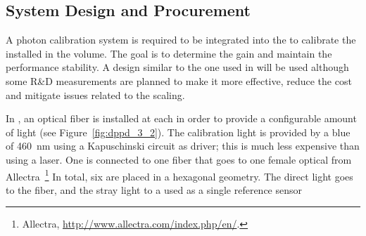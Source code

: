 \subsection{System Design and Procurement}
\label{sec:fddp-pd-5.1}

A photon calibration system is required to be integrated into the  to calibrate the  
installed in the \lar volume. The goal is to determine the  gain and maintain the  performance stability. A design similar to the one used in  will be used although some R\&D measurements are planned to make it more effective, reduce the cost and mitigate issues related to the scaling.

In , an optical fiber is installed at each  in order to provide a configurable amount of light (see Figure~\ref{fig:dppd_3_2}). The calibration light is provided by a blue   of \SI{460}{nm} using a Kapuschinski circuit as   driver; this is much less expensive than using a laser.
One  is connected to one fiber that goes to one female optical \fdth from Allectra~\footnote{Allectra\texttrademark{}, \url{http://www.allectra.com/index.php/en/}.} %
In total,  six   are placed in a hexagonal geometry. The direct light goes to the fiber, and the stray light to a  used as a single reference sensor %
